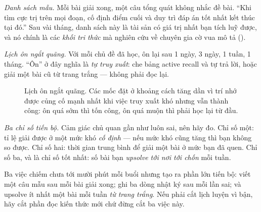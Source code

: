 \documentclass[../../algorithm.tex]{subfiles}
\begin{document}
\emph{Danh sách mẫu.} Mỗi bài giải xong, một câu tổng quát không nhắc đề bài. ``Khi tìm cực trị trên mọi đoạn, cố định điểm cuối và duy trì đáp án tốt nhất kết thúc tại đó.'' Sau vài tháng, danh sách này là tài sản có giá trị nhất bạn tích luỹ được, và nó chính là các \emph{khối tri thức} mà nghiên cứu về chuyên gia cờ vua mô tả ().

\emph{Lịch ôn ngắt quãng.} Với mỗi chủ đề đã học, ôn lại sau 1 ngày, 3 ngày, 1 tuần, 1 tháng. ``Ôn'' ở đây nghĩa là \emph{tự truy xuất}: che bảng active recall và tự trả lời, hoặc giải một bài cũ từ trang trắng --- không phải đọc lại.

\begin{figure}[H]\centering
{}
\caption{Lịch ôn ngắt quãng. Các mốc đặt ở khoảng cách tăng dần vì trí nhớ được củng cố mạnh nhất khi việc truy xuất khó nhưng vẫn thành công: ôn quá sớm thì tốn công, ôn quá muộn thì phải học lại từ đầu.}
\label{fig:spaced}
\end{figure}

\emph{Ba chỉ số tiến bộ.} Cảm giác chủ quan gần như luôn sai, nên hãy đo. Chỉ số một: tỉ lệ giải được ở một mức khó \emph{cố định} --- nếu mức khó cũng tăng thì bạn không so được. Chỉ số hai: thời gian trung bình để giải một bài ở mức bạn đã quen. Chỉ số ba, và là chỉ số tốt nhất: số bài bạn \emph{upsolve tới nơi tới chốn} mỗi tuần.

\begin{cannho}
Ba việc chiếm chưa tới mười phút mỗi buổi nhưng tạo ra phần lớn tiến bộ: viết một câu mẫu sau mỗi bài giải xong; ghi ba dòng nhật ký sau mỗi lần sai; và upsolve ít nhất một bài mỗi tuần \emph{từ trang trắng}. Nếu phải cắt lịch luyện vì bận, hãy cắt phần đọc kiến thức mới chứ đừng cắt ba việc này.
\end{cannho}
\end{document}
